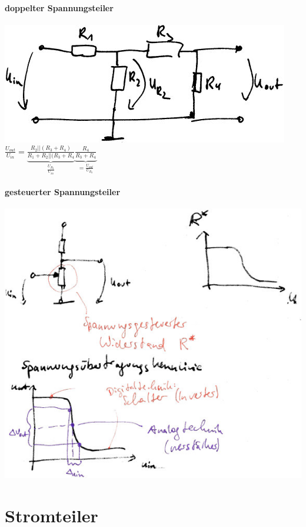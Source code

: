 \paragraph{doppelter Spannungsteiler} \parskp
\includegraphics[scale=.75]{Abbildungen/ABB212}\\
$\frac{U_{out}}{U_{in}}=\underbrace{\frac{R_2|| (R_3+R_4)}{R_1+R_2||(R_3+R_4}}_{\frac{U_{R_2}}{U_{in}}} \underbrace{\frac{R_4}{R_3+R_4}}_{=\frac{U_{out}}{U_{R_2}}}$

\paragraph{gesteuerter Spannungsteiler}\parskp
\includegraphics[scale=.75]{Abbildungen/ABB301}

\section{Stromteiler}

